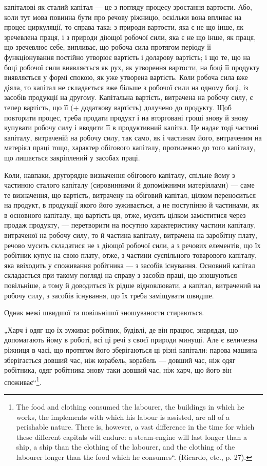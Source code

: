 \parcont{}  %
капіталові як сталий капітал — це з погляду процесу зростання вартости.
Або, коли тут мова повинна бути про речову ріжницю, оскільки вона
впливає на процес циркуляції, то справа така: з природи вартости, яка є
не що інше, як зречевлена праця, і з природи діющої робочої сили, яка
є не що інше, як праця, що зречевлює себе, випливає, що робоча сила
протягом періоду її функціонування постійно утворює вартість і доларову
вартість; і що те, що на боці робочої сили виявляється як рух, як
утворення вартости, на боці її продукту виявляється у формі спокою,
як уже утворена вартість. Коли робоча сила вже діяла, то капітал не
складається вже більше з робочої сили на одному боці, із засобів продукції
на другому. Капітальна вартість, витрачена на робочу силу, є тепер
вартість, що її (+ додаткову вартість) долучено до продукту. Щоб
повторити процес, треба продати продукт і на вторговані гроші знову й
знову купувати робочу силу і вводити її в продуктивний капітал. Це
надає тоді частині капіталу, витраченій на робочу силу, так само, як і частинам
його, витраченим на матеріял праці тощо, характер обігового капіталу,
протилежно до того капіталу, що лишається закріплений у засобах праці.

Коли, навпаки, другорядне визначення обігового капіталу, спільне
йому з частиною сталого капіталу (сировинними й допоміжними матеріяламн)
— саме те визначення, що вартість, витрачену на обіговий капітал,
цілком переноситься на продукт, в продукції якого його зуживається, а
не поступінно й частинами, як в основного капіталу, що вартість ця,
отже, мусить цілком заміститися через продаж продукту, — перетворити
на посутню характеристику частини капіталу, витраченої на робочу силу,
то й частина капіталу, витрачена на заробітну плату, речово мусить
складатися не з діющої робочої сили, а з речових елементів, що їх робітник
купує на свою плату, отже, з частини суспільного товарового капіталу,
яка ввіходить у споживання робітника — з засобів існування.
Основний капітал складається при такому погляді на справу з засобів
праці, що зношуються повільніше, а тому й доводиться їх рідше відновлювати,
а капітал, витрачений на робочу силу, з засобів існування, що
їх треба заміщувати швидше.

Однак межі швидшої та повільнішої зношуваности стираються.

„Харч і одяг що їх зуживає робітник, будівлі, де він працює, знаряддя,
що допомагають йому в роботі, всі ці речі з своєї природи минущі.
Але є величезна ріжниця в часі, що протягом його зберігаються
ці різні капітали: парова машина зберігається довший час, ніж корабель,
корабель — довший час, ніж одяг робітника, одяг робітника знову таки
довший час, ніж харч, що його він споживає“\footnote{
The food and clothing consumed the labourer, the buildings in which he
works, the implements with which his labour is assisted, are all of a perishable
nature. There is, however, a vast difference in the time for which these different
capitals will endure: a steam-engine will last longer than a ship, a ship than the
clothing of the labourer, and the clothing of the labourer longer than the food which
he consumes“. (Ricardo, etc., p. 27).
}.
